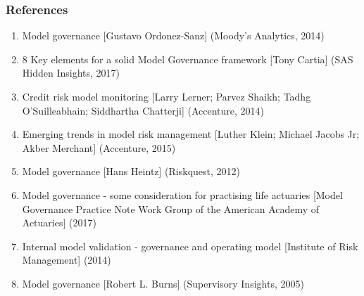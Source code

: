 \documentclass[11pt]{beamer}
\begin{document}

\begin{frame}
\frametitle{References}
\begin{enumerate}
	\item Model governance [Gustavo Ordonez-­Sanz] (Moody's Analytics, 2014)
	\item 8 Key elements for a solid Model Governance framework [Tony Cartia] (SAS Hidden Insights, 2017)
	\item Credit risk model monitoring [Larry Lerner; Parvez Shaikh; Tadhg O’Suilleabhain; Siddhartha Chatterji] (Accenture, 2014)
	\item Emerging trends in model risk management [Luther Klein; Michael Jacobs Jr; Akber Merchant] (Accenture, 2015)
	\item Model governance [Hans Heintz] (Riskquest, 2012)
	\item Model governance - some consideration for practising life actuaries [Model Governance Practice Note Work Group of the American Academy of Actuaries] (2017)
	\item Internal model validation - governance and operating model [Institute of Risk Management] (2014)
	\item Model governance [Robert L. Burns] (Supervisory Insights, 2005)
\end{enumerate}
\end{frame}
\end{document}
